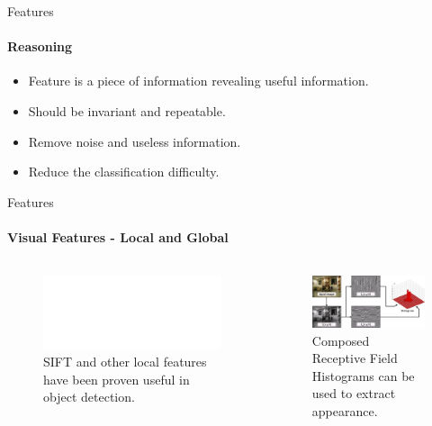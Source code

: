 \documentclass[compress]{beamer}
\begin{document}
\begin{frame}{Features}
\framesubtitle{Reasoning}
    \begin{itemize}
        \item Feature is a piece of information revealing useful information.
        \item Should be invariant and repeatable.
        \item Remove noise and useless information.
        \item Reduce the classification difficulty.
    \end{itemize}
\end{frame}


\begin{frame}{Features}
\framesubtitle{Visual Features - Local and Global}
    \begin{columns}[t]

    \begin{figure}
        \includegraphics[width=\textwidth]{sift/sift}
        \caption{SIFT and other local features have been proven useful in object detection.}
    \end{figure}
    \begin{figure}
    \includegraphics[width=\textwidth]{crfh_model}
    \caption{Composed Receptive Field Histograms can be used to extract appearance.}
    \end{figure}
    \end{columns}
\end{frame}
\end{document}
